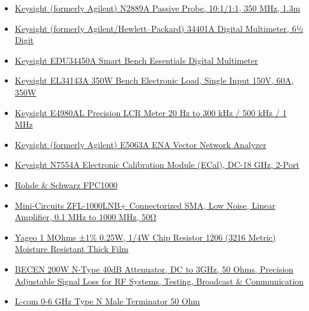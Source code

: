 \begin{appendices}
\begin{itemize}
        \item \href{https://www.keysight.com/us/en/product/N2889A/passive-probe-10-1-1-1-350-mhz-1-3m.html}{Keysight (formerly Agilent) N2889A Passive Probe, 10:1/1:1, 350 MHz, 1.3m}
        \item \href{https://www.keysight.com/us/en/product/34401A/digital-multimeter-6-digit.html}{Keysight (formerly Agilent/Hewlett--Packard) 34401A Digital Multimeter, 6½ Digit}
        \item \href{https://www.keysight.com/us/en/product/EDU34450A/smart-bench-essentials-digital-multimeter-5-5-digit.html}{Keysight EDU34450A Smart Bench Essentials Digital Multimeter}
        \item \href{https://www.keysight.com/us/en/product/EL34143A/dc-electronic-load-single-input-150v-60a-350w-lan-usb.html}{Keysight EL34143A 350W Bench Electronic Load, Single Input 150V, 60A, 350W}
        \item \href{https://www.keysight.com/us/en/product/E4980AL/precision-lcr-meter-20-hz-300-khz-500-khz-1-mhz.html}{Keysight E4980AL Precision LCR Meter 20 Hz to 300 kHz / 500 kHz / 1 MHz}
        \item \href{https://www.keysight.com/us/en/product/E5063A/e5063a-ena-vector-network-analyzer.html}{Keysight (formerly Agilent) E5063A ENA Vector Network Analyzer}
        \item \href{https://www.keysight.com/us/en/product/N7554A/electronic-calibration-module-ecal-dc-18-ghz-2-port.html}{Keysight N7554A Electronic Calibration Module (ECal), DC-18 GHz, 2-Port}
        \item \href{https://www.rohde-schwarz.com/us/products/test-and-measurement/benchtop-analyzers/rs-fpc-spectrum-analyzer_63493-542324.html}{Rohde \& Schwarz FPC1000}
        \item \href{https://www.minicircuits.com/WebStore/dashboard.html?model=ZFL-1000LNB%2B}{Mini-Circuits ZFL-1000LNB+ Connectorized SMA, Low Noise, Linear Amplifier, 0.1 MHz to 1000 MHz, 50Ω}
        \item \href{https://www.yageogroup.com/products/Resistors/part/RC1206FR-131ML}{Yageo 1 MOhms ±1\% 0.25W, 1/4W Chip Resistor 1206 (3216 Metric) Moisture Resistant Thick Film}
        \item \href{https://www.amazon.com/40dB-Attenuator-Precision-Adjustable-Communication/dp/B0F9VRD3KJ}{BECEN 200W N-Type 40dB Attenuator, DC to 3GHz, 50 Ohms, Precision Adjustable Signal Loss for RF Systems, Testing, Broadcast \& Communication}
        \item \href{https://www.l-com.com/bandpass-filter-rf-splitter-0-6-ghz-type-n-male-terminator-50-ohm}{L-com 0-6 GHz Type N Male Terminator 50 Ohm}
    \end{itemize}
\end{appendices}
